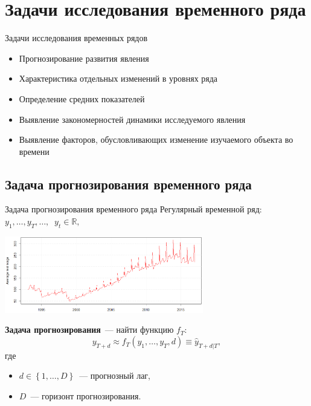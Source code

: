 \documentclass[10pt,pdf,utf8,hyperref={unicode},aspectratio=169]{beamer}
\begin{document}
\section{Задачи исследования временного ряда}
\begin{frame}{Задачи исследования временных рядов}
	\begin{itemize}
		\item Прогнозирование развития явления
		\item Характеристика отдельных изменений в уровнях ряда 
		\item Определение средних показателей
		\item Выявление закономерностей динамики исследуемого явления
		\item Выявление факторов, обусловливающих изменение изучаемого объекта во времени
	\end{itemize}
\end{frame}


\subsection{Задача прогнозирования временного ряда}
\begin{frame}{Задача прогнозирования временного ряда}
	Регулярный временной ряд: $y_1,\dots,y_T,\dots,\;\; y_t\in\mathbb{R},$
	
	\begin{center}
		\includegraphics[width=0.65\textwidth]{wage.png}
	\end{center}
	
	\textbf{Задача прогнозирования}~--- найти функцию $f_T\colon$
	$$
	y_{T+d} \approx f_T\left(y_1,\ldots,y_T, d\right) \equiv \hat{y}_{T+d|T},$$
	где 
	\begin{itemize}
		\item $d \in \left\{1,\dots,D\right\}$~--- прогнозный лаг, 
		\item $D$~--- горизонт прогнозирования.		
	\end{itemize}
	
\end{frame}
\end{document}
